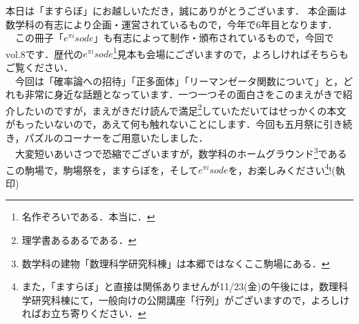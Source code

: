
本日は「ますらぼ」にお越しいただき，誠にありがとうございます．
本企画は数学科の有志により企画・運営されているもので，今年で6年目となります．\\
　この冊子「$e^{\pi i}sode$」も有志によって制作・頒布されているもので，今回でvol.8です．歴代の$e^{\pi i}sode$\footnote{名作ぞろいである．本当に．}見本も会場にございますので，よろしければそちらもご覧ください．\\
　今回は「確率論への招待」「正多面体」「リーマンゼータ関数について」と，どれも非常に身近な話題となっています．一つ一つその面白さをこのまえがきで紹介したいのですが，まえがきだけ読んで満足\footnote{理学書あるあるである．}していただいてはせっかくの本文がもったいないので，あえて何も触れないことにします．今回も五月祭に引き続き，パズルのコーナーをご用意いたしました．\\
　大変短いあいさつで恐縮でございますが，数学科のホームグラウンド\footnote{数学科の建物「数理科学研究科棟」は本郷ではなくここ駒場にある．}であるこの駒場で，駒場祭を，ますらぼを，そして$e^{\pi i}sode$を，お楽しみください\footnote{また，「ますらぼ」と直接は関係ありませんが11/23(金)の午後には，数理科学研究科棟にて，一般向けの公開講座「行列」がございますので，よろしければお立ち寄りください．}!(執印)
